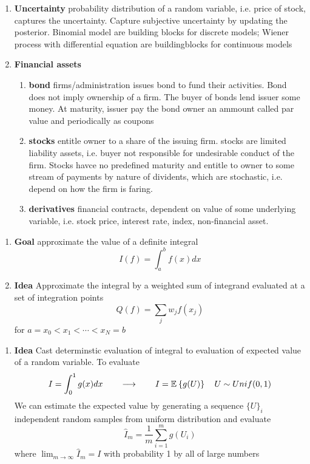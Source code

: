 \documentclass[11pt]{article}
\begin{document}
\begin{enumerate}
    \item \textbf{Uncertainty} probability distribution of a random variable, i.e. price of stock, captures the uncertainty. Capture subjective uncertainty by updating the posterior. Binomial model are building blocks for discrete models; Wiener process with differential equation are buildingblocks for continuous models
    \item \textbf{Financial assets}
    \begin{enumerate}
        \item \textbf{bond} firms/administration issues bond to fund their activities. Bond does not imply ownership of a firm. The buyer of bonds lend issuer some money. At maturity, issuer pay the bond owner an ammount called par value and periodically as coupons
        \item \textbf{stocks} entitle owner to a share of the issuing firm. stocks are limited liability assets, i.e. buyer not responsible for undesirable conduct of the firm. Stocks havce no predefined maturity and entitle to owner to some stream of payments by nature of dividents, which are stochastic, i.e. depend on how the firm is faring. 
        \item \textbf{derivatives} financial contracts, dependent on value of some underlying variable, i.e. stock price, interest rate, index, non-financial asset.
    \end{enumerate}
\end{enumerate}
 




\begin{enumerate}
    \item \textbf{Goal} approximate the value of a definite integral 
    \[
        I(f) = \int_{a}^b f(x) dx    
    \]
    \item \textbf{Idea} Approximate the integral by a weighted sum of integrand evaluated at a set of integration points 
    \[
        Q(f) = \sum_j w_j f(x_j)  
    \]
    for $a = x_0 < x_1 < \cdots < x_N = b$ 
\end{enumerate}




\begin{enumerate}
    \item \textbf{Idea} Cast determinstic evaluation of integral to evaluation of expected value of a random variable. To evaluate 
    \[
        I = \int_0^1 g(x) dx 
        \qquad 
        \longrightarrow 
        \qquad 
        I = \mathbb{E}_{}\left\{g(U)\right\}
        \quad U\sim Unif(0,1)
    \]
    We can estimate the expected value by generating a sequence $\{U\}_i$ independent random samples from uniform distribution and evaluate 
    \[
        \hat{I}_m = \frac{1}{m} \sum_{i=1}^m g(U_i)
    \]
    where $\lim_{m\to \infty} \hat{I}_m = I$ with probability 1 by all of large numbers
\end{enumerate}
\end{document}
